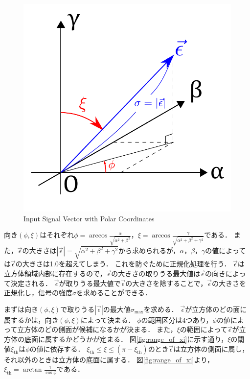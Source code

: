 \documentclass[../master]{subfiles}
\begin{document}
  \begin{figure}[ht]
    \centering
    \includegraphics[width=60truemm, clip]{images/signal_vector.pdf}
    \caption{Input Signal Vector with Polar Coordinates}
    \label{fig:signal_vector}
  \end{figure}

  向き$(\phi, \xi)$はそれぞれ$\phi = \arccos{\frac{\alpha}{\sqrt{\alpha^2 + \beta^2}}}$，$\xi = \arccos{\frac{\gamma}{\sqrt{\alpha^2 + \beta^2 + \gamma^2}}}$である．
  また，$\vec{\epsilon}$の大きさは$|\vec{\epsilon}| = \sqrt{\alpha^2 + \beta^2 + \gamma^2}$から求められるが，$\alpha$，$\beta$，$\gamma$の値によっては$\vec{\epsilon}$の大きさは1.0を超えてしまう．
  これを防ぐために正規化処理を行う．
  $\vec{\epsilon}$は立方体領域内部に存在するので，$\vec{\epsilon}$の大きさの取りうる最大値は$\vec{\epsilon}$の向きによって決定される．
  $\vec{\epsilon}$が取りうる最大値で$\vec{\epsilon}$の大きさを除することで，$\vec{\epsilon}$の大きさを正規化し，信号の強度$\sigma$を求めることができる．

  まずは向き$(\phi, \xi)$で取りうる$|\vec{\epsilon}|$の最大値$\sigma_{\text{max}}$を求める．
  $\vec{\epsilon}$が立方体のどの面に属するかは，向き$(\phi, \xi)$によって決まる．
  $\phi$の範囲区分は4つあり，$\phi$の値によって立方体のどの側面が候補になるかが決まる．
  また，$\xi$の範囲によって$\vec{\epsilon}$が立方体の底面に属するかどうかが定まる．
  図\ref{fig:range_of_xi}に示す通り，$\xi$の閾値$\xi_{\text{th}}$は$\phi$の値に依存する．
  $\xi_{\text{th}} \leq \xi \leq (\pi - \xi_{\text{th}})$のとき$\vec{\epsilon}$は立方体の側面に属し，
  それ以外のときは立方体の底面に属する．
  図\ref{fig:range_of_xi}より，$\xi_{\text{th}} = \arctan{\frac{1}{\cos{\phi}}}$である．
\end{document}
